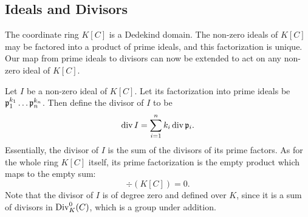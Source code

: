 \begin{comment}
  ($\impliedby$) Suppose $f$ has a zero at $\sigma(P)$, i.e. $f(\sigma(x_0), \sigma(y_0)) = 0$.
  Then $\sigma$ has an inverse $\sigma\inv \in \Gal(\bar K/K)$ and
  \[ f(x_0, y_0) = \sigma\inv(\sigma(f(x_0, y_0))) = \sigma\inv(f(\sigma(x_0), \sigma(y_0))) = \sigma\inv(0) = 0. \] 
\end{proof}

\note{Not sure where to place following lemma.}
\begin{lemma}
  Let $P$ be an affine point.
  Let $I_P$ be the ideal of polynomials vanshing on $\orb(P)$.
  Then $I_P$ is a prime ideal.
\end{lemma}
\begin{proof}
  Suppose $fg \in I_P$.
  Then $0 = (fg)(P) = f(P)g(P)$.
  Since $f(P)$ and $g(P)$ are field elements in $\bar K$, either $f(P) = 0$ or $g(P) = 0$.
  By Corollary \ref{cor_orb}, either $f$ vanishes on $\orb(P)$ or $g$ vanishes on $\orb(P)$.
  Therefore at least one of $f$ or $g$ is in $I_P$.
\end{proof}
\end{comment}




\subsection{Ideals and Divisors}

The coordinate ring $K[C]$ is a Dedekind domain.
The non-zero ideals of $K[C]$ may be factored into a product of prime ideals, and this factorization is unique.
Our map from prime ideals to divisors can now be extended to act on any non-zero ideal of $K[C]$.

Let $I$ be a non-zero ideal of $K[C]$.
Let its factorization into prime ideals be $\frak p_1^{k_1} \dots \frak p_n^{k_n}$.
Then define the divisor of $I$ to be
\[ \div I = \sum_{i=1}^n k_i \div \frak p_i. \]
Essentially, the divisor of $I$ is the sum of the divisors of its prime factors.
As for the whole ring $K[C]$ itself,
its prime factorization is the empty product which maps to the empty sum:
  \[ \div (K[C]) = 0. \]
Note that the divisor of $I$ is of degree zero and defined over $K$,
since it is a sum of divisors in $\Div_K^0(C)$, which is a group under addition.

